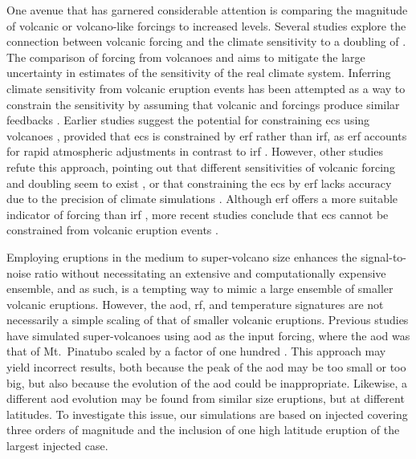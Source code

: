 \documentclass{ametsocV6.1}
\newcommand{\iso}[1][i]{{#1}njected \ce{SO2}}
\begin{document}
One avenue that has garnered considerable attention is comparing the magnitude of
volcanic or volcano-like forcings to increased  levels. Several studies explore
the connection between volcanic forcing and the climate sensitivity to a doubling of
\citep{boer2007,marvel2016,merlis2014,ollila2016,richardson2019,salvi2022,wigley2005}.
The comparison of forcing from volcanoes and  aims to mitigate the large
uncertainty in estimates of the sensitivity of the real climate system. Inferring
climate sensitivity from volcanic eruption events has been attempted as a way to
constrain the sensitivity \citep{boer2007} by assuming that volcanic and 
forcings produce similar feedbacks \citep{pauling2023}. Earlier studies suggest the
potential for constraining \gls{ecs} using volcanoes \citep{bender2010}, provided that
\gls{ecs} is constrained by \gls{erf} rather than \gls{irf}, as \gls{erf} accounts for
rapid atmospheric adjustments in contrast to \gls{irf} \citep{richardson2019}. However,
other studies refute this approach, pointing out that different sensitivities of
volcanic forcing and  doubling seem to exist \citep{douglass2006}, or that
constraining the \gls{ecs} by \gls{erf} lacks accuracy due to the precision of climate
simulations \citep{boer2007,salvi2022}. Although \gls{erf} offers a more suitable
indicator of forcing than \gls{irf} \citep{marvel2016,richardson2019}, more recent
studies conclude that \gls{ecs} cannot be constrained from volcanic eruption events
\citep{pauling2023}.

Employing eruptions in the medium to super-volcano size enhances the signal-to-noise
ratio without necessitating an extensive and computationally expensive ensemble, and as
such, is a tempting way to mimic a large ensemble of smaller volcanic eruptions.
However, the \gls{aod}, \gls{rf}, and temperature signatures are not necessarily a
simple scaling of that of smaller volcanic eruptions. Previous studies have simulated
super-volcanoes using \gls{aod} as the input forcing, where the \gls{aod} was that of
Mt.\ Pinatubo scaled by a factor of one hundred \citep{jones2005}. This approach may
yield incorrect results, both because the peak of the \gls{aod} may be too small or too
big, but also because the evolution of the \gls{aod} could be inappropriate. Likewise, a
different \gls{aod} evolution may be found from similar size eruptions, but at different
latitudes. To investigate this issue, our simulations are based on \iso{} covering three
orders of magnitude and the inclusion of one high latitude eruption of the largest
\iso{} case.
\end{document}
